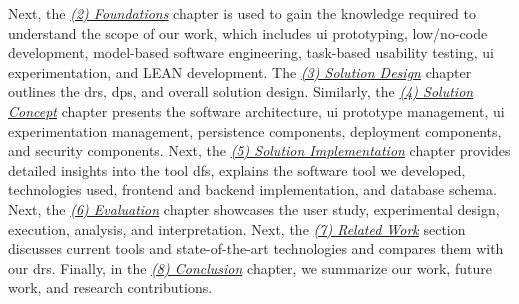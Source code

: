 Next, the \textit{\hyperref[chap:foundations]{(2) Foundations}} chapter is used to gain the knowledge required to understand the scope of our work, which includes \ac{ui} prototyping, low/no-code development, model-based software engineering, task-based usability testing, \ac{ui} experimentation, and LEAN development.
The \textit{\hyperref[chap:design]{(3) Solution Design}} chapter outlines the \ac{dr}s, \ac{dp}s, and overall solution design. 
Similarly, the \textit{\hyperref[chap:concept]{(4) Solution Concept}} chapter presents the software architecture, \ac{ui} prototype management, \ac{ui} experimentation management, persistence components, deployment components, and security components.
Next, the \textit{\hyperref[chap:implementation]{(5) Solution Implementation}} chapter provides detailed insights into the tool \ac{df}s, explains the software tool we developed, technologies used, frontend and backend implementation, and database schema. 
Next, the \textit{\hyperref[chap:evaluation]{(6) Evaluation}} chapter showcases the user study, experimental design, execution, analysis, and interpretation. 
Next, the \textit{\hyperref[chap:relatedWork]{(7) Related Work}} section discusses current tools and state-of-the-art technologies and compares them with our \ac{dr}s.
Finally, in the \textit{\hyperref[chap:conclusion]{(8) Conclusion}} chapter, we summarize our work, future work, and research contributions.
